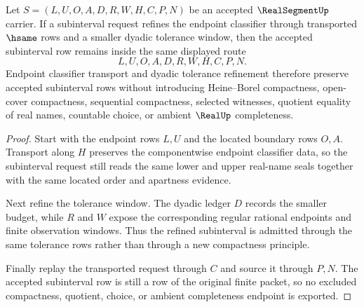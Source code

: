 \begin{theorem}
\label{thm:real-segment-located-subinterval-transport}
Let $S=(L,U,O,A,D,R,W,H,C,P,N)$ be an accepted $\RealSegmentUp$ carrier. If a subinterval request refines the endpoint classifier through transported $\hsame$ rows and a smaller dyadic tolerance window, then the accepted subinterval row remains inside the same displayed route
$$
L,U,O,A,D,R,W,H,C,P,N.
$$
Endpoint classifier transport and dyadic tolerance refinement therefore preserve accepted subinterval rows without introducing Heine--Borel compactness, open-cover compactness, sequential compactness, selected witnesses, quotient equality of real names, countable choice, or ambient $\RealUp$ completeness.
\end{theorem}
\begin{proof}
Start with the endpoint rows $L,U$ and the located boundary rows $O,A$. Transport along $H$ preserves the componentwise endpoint classifier data, so the subinterval request still reads the same lower and upper real-name seals together with the same located order and apartness evidence.

Next refine the tolerance window. The dyadic ledger $D$ records the smaller budget, while $R$ and $W$ expose the corresponding regular rational endpoints and finite observation windows. Thus the refined subinterval is admitted through the same tolerance rows rather than through a new compactness principle.

Finally replay the transported request through $C$ and source it through $P,N$. The accepted subinterval row is still a row of the original finite packet, so no excluded compactness, quotient, choice, or ambient completeness endpoint is exported.
\end{proof}


\begin{closurestatus}{\RealSegmentUp}
  \theoryclosure{\seedClosure}
  \formalstatus{\unformalizedV}
\end{closurestatus}
